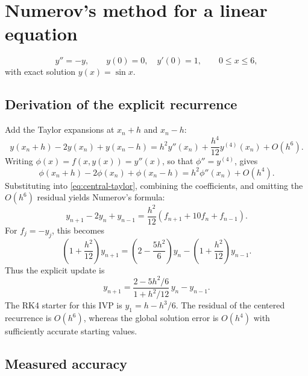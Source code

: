 \documentclass[11pt,a4paper]{article}
\begin{document}
\clearpage
\section{Numerov's method for a linear equation}
\[
y''=-y,\qquad y(0)=0,\quad y'(0)=1,\qquad 0\le x\le6,
\]
with exact solution $y(x)=\sin x$.

\subsection{Derivation of the explicit recurrence}
Add the Taylor expansions at $x_n+h$ and $x_n-h$:
\begin{equation}
y(x_n+h)-2y(x_n)+y(x_n-h)
=h^2y''(x_n)+\frac{h^4}{12}y^{(4)}(x_n)+O(h^6).
\label{eq:central-taylor}
\end{equation}
Writing $\phi(x)=f(x,y(x))=y''(x)$, so that $\phi''=y^{(4)}$, gives
\[
\phi(x_n+h)-2\phi(x_n)+\phi(x_n-h)=h^2\phi''(x_n)+O(h^4).
\]
Substituting into \eqref{eq:central-taylor}, combining the coefficients,
and omitting the $O(h^6)$ residual yields Numerov's formula:
\begin{equation}
\boxed{y_{n+1}-2y_n+y_{n-1}
=\frac{h^2}{12}\left(f_{n+1}+10f_n+f_{n-1}\right).}
\label{eq:numerov}
\end{equation}
For $f_j=-y_j$, this becomes
\[
\left(1+\frac{h^2}{12}\right)y_{n+1}
=\left(2-\frac{5h^2}{6}\right)y_n
-\left(1+\frac{h^2}{12}\right)y_{n-1}.
\]
Thus the explicit update is
\begin{equation}
\boxed{y_{n+1}=\frac{2-5h^2/6}{1+h^2/12}\,y_n-y_{n-1}.}
\end{equation}
The RK4 starter for this IVP is $y_1=h-h^3/6$. The residual of the
centered recurrence is $O(h^6)$, whereas the global solution error is
$O(h^4)$ with sufficiently accurate starting values.

\subsection{Measured accuracy}
\end{document}

